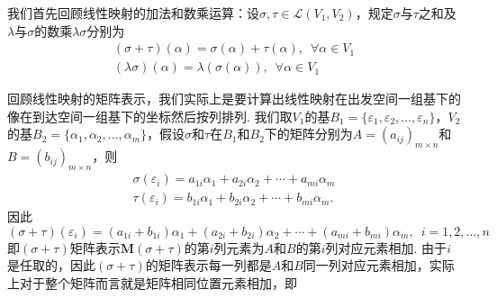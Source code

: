 我们首先回顾线性映射的加法和数乘运算：设$\sigma,\tau\in \mathcal{L}(V_1,V_2)$，规定$\sigma$与$\tau$之和及$\lambda$与$\sigma$的数乘$\lambda\sigma$分别为
\begin{gather*}
    (\sigma+\tau)(\alpha)=\sigma(\alpha)+\tau(\alpha),\enspace\forall\alpha\in V_1 \\
    (\lambda\sigma)(\alpha)=\lambda(\sigma(\alpha)),\enspace\forall\alpha\in V_1
\end{gather*}

回顾线性映射的矩阵表示，我们实际上是要计算出线性映射在出发空间一组基下的像在到达空间一组基下的坐标然后按列排列. 我们取$V_1$的基$B_1=\{\varepsilon_1,\varepsilon_2,\ldots,\varepsilon_n\}$，$V_2$的基$B_2=\{\alpha_1,\alpha_2,\ldots,\alpha_m\}$，假设$\sigma$和$\tau$在$B_1$和$B_2$下的矩阵分别为$A=(a_{ij})_{m\times n}$和$B=(b_{ij})_{m\times n}$，则
\begin{gather*}
    \sigma(\varepsilon_i)=a_{1i}\alpha_1+a_{2i}\alpha_2+\cdots+a_{mi}\alpha_m \\
    \tau(\varepsilon_i)=b_{1i}\alpha_1+b_{2i}\alpha_2+\cdots+b_{mi}\alpha_m.
\end{gather*}
因此
\[(\sigma+\tau)(\varepsilon_i)=(a_{1i}+b_{1i})\alpha_1+(a_{2i}+b_{2i})\alpha_2+\cdots+(a_{mi}+b_{mi})\alpha_m,\enspace i=1,2,\ldots,n\]
即$(\sigma+\tau)$矩阵表示$\mathbf{M}(\sigma+\tau)$的第$i$列元素为$A$和$B$的第$i$列对应元素相加. 由于$i$是任取的，因此$(\sigma+\tau)$的矩阵表示每一列都是$A$和$B$同一列对应元素相加，实际上对于整个矩阵而言就是矩阵相同位置元素相加，即
